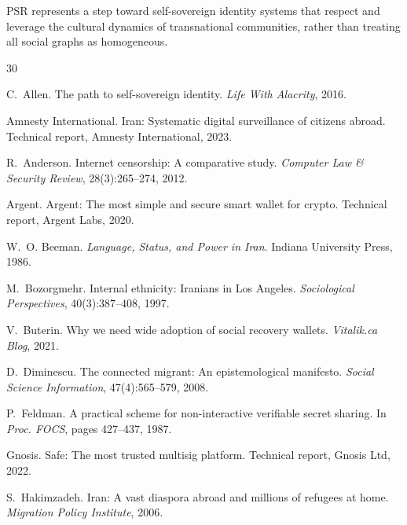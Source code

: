\documentclass[11pt,a4paper,twocolumn]{article}
\begin{document}
PSR represents a step toward self-sovereign identity systems that respect and leverage the cultural dynamics of transnational communities, rather than treating all social graphs as homogeneous.


\begin{thebibliography}{30}

C.~Allen.
\newblock The path to self-sovereign identity.
\newblock \emph{Life With Alacrity}, 2016.

{Amnesty International}.
\newblock Iran: Systematic digital surveillance of citizens abroad.
\newblock Technical report, Amnesty International, 2023.

R.~Anderson.
\newblock Internet censorship: A comparative study.
\newblock \emph{Computer Law \& Security Review}, 28(3):265--274, 2012.

{Argent}.
\newblock Argent: The most simple and secure smart wallet for crypto.
\newblock Technical report, Argent Labs, 2020.

W.~O. Beeman.
\newblock \emph{Language, Status, and Power in Iran}.
\newblock Indiana University Press, 1986.

M.~Bozorgmehr.
\newblock Internal ethnicity: Iranians in Los Angeles.
\newblock \emph{Sociological Perspectives}, 40(3):387--408, 1997.

V.~Buterin.
\newblock Why we need wide adoption of social recovery wallets.
\newblock \emph{Vitalik.ca Blog}, 2021.

D.~Diminescu.
\newblock The connected migrant: An epistemological manifesto.
\newblock \emph{Social Science Information}, 47(4):565--579, 2008.

P.~Feldman.
\newblock A practical scheme for non-interactive verifiable secret sharing.
\newblock In \emph{Proc. FOCS}, pages 427--437, 1987.

{Gnosis}.
\newblock Safe: The most trusted multisig platform.
\newblock Technical report, Gnosis Ltd, 2022.

S.~Hakimzadeh.
\newblock Iran: A vast diaspora abroad and millions of refugees at home.
\newblock \emph{Migration Policy Institute}, 2006.


\end{thebibliography}
\end{document}
